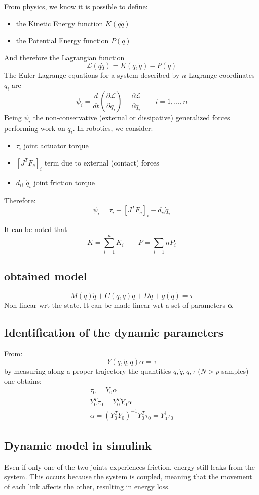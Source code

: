 \documentclass{book}
\begin{document}
From physics, we know it is possible to define:
\begin{itemize}
    \item the Kinetic Energy function $K(q\dot{q})$
    \item the Potential Energy function $P(q)$
\end{itemize}
And therefore the Lagrangian function 
\[
    \mathcal{L}(q\dot{q})=K(q,\dot{q})-P(q)
\]
The Euler-Lagrange equations for a system described by $n$ Lagrange coordinates $q_i$ are
\[
    \psi_i=\frac{d}{dt}\left(\frac{\partial \mathcal{L}}{\partial \dot{q}_i}\right) - \frac{\partial \mathcal{L}}{\partial q_i} \qquad i=1,\dots,n
\]
Being $\psi_i$ the non-conservative (external or dissipative) generalized forces performing work on $q_i$. In robotics, we consider:
\begin{itemize}
    \item $\tau_i$ joint actuator torque
    \item $[J^TF_c]_i$ term due to external (contact) forces
    \item $d_{ii}$ $\dot{q}_i$ joint friction torque
\end{itemize}
Therefore:
\[
    \psi_i=\tau_i+[J^TF_c]_i-d_{ii}\dot{q}_i
\]

It can be noted that
\[
    K=\sum_{i=1}^{n}K_i \qquad P=\sum_{i=1}{n}P_i
\]

\subsection{obtained model}
\[
    M(q)\ddot{q} + C(q,\dot{q})\dot{q}+D\dot{q}+g(q)=\tau
\]
Non-linear wrt the state. It can be made linear wrt a set of parameters $\mathbf{\alpha}$

\subsection{Identification of the dynamic parameters}
From:
\[
    Y(q,\dot{q},\ddot{q})\alpha = \tau
\]
by measuring along a proper trajectory the quantities $q,\dot{q},\ddot{q}, \tau$ ($N>p$ samples) one obtains:
\begin{gather*}
    \tau_0=Y_0\alpha\\
    Y_0^T\tau_0 = Y_0^TY_0\alpha\\
    \alpha = (Y_0^TY_0)^{-1}Y_0^T\tau_0=Y_0^\dag \tau_0
\end{gather*}
\subsection{Dynamic model in simulink}
Even if only one of the two joints experiences friction, energy still leaks from the system. This occurs because the system is coupled, meaning that the movement of each link affects the other, resulting in energy loss.
\end{document}

